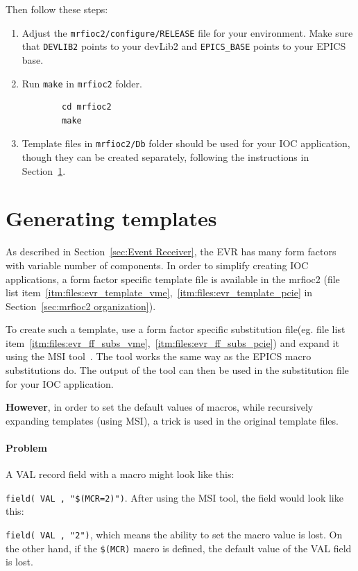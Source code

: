 \documentclass[12pt,a4paper]{article}
\let\stdsection\section
\renewcommand\section{\newpage\stdsection}
\begin{document}
Then follow these steps:
\begin{enumerate}
	\item 
		Adjust the \texttt{mrfioc2/configure/RELEASE} file for your environment. Make sure that \texttt{DEVLIB2} points to your devLib2 and \texttt{EPICS\_BASE} points to your EPICS base.
	\item 
		Run \texttt{make} in \texttt{mrfioc2} folder.
		\begin{verbatim}
		cd mrfioc2
		make
		\end{verbatim}
	\item 
		Template files in \texttt{mrfioc2/Db} folder should be used for your IOC application, though they can be created separately, following the instructions in Section~\ref{sec:Generating templates}.
\end{enumerate}

\section{Generating templates}\label{sec:Generating templates}
As described in Section~\ref{sec:Event Receiver}, the EVR has many form factors with variable number of components. In order to simplify creating IOC applications, a form factor specific template file is available in the mrfioc2 (file list item~\ref{itm:files:evr_template_vme},~\ref{itm:files:evr_template_pcie} in Section~\ref{sec:mrfioc2 organization}).

To create such a template, use a form factor specific substitution file(eg. file list item~\ref{itm:files:evr_ff_subs_vme},~\ref{itm:files:evr_ff_subs_pcie}) and expand it using the
MSI tool~\cite{msi}. The tool works the same way as the EPICS macro substitutions do. The output of
the tool can then be used in the substitution file for your IOC application.

\textbf{However}, in order to set the default values of macros, while
recursively expanding templates (using MSI), a trick is used in the original template files.

\paragraph{Problem}\label{problem}
A VAL record field with a macro might look like this:

\texttt{field( VAL , "\$(MCR=2)")}. 
After using the MSI tool, the field would look like this: 

\texttt{field( VAL , "2")}, 
which means the ability to set the macro value is lost. On the other hand, if the \texttt{\$(MCR)} macro is defined, the default value of the VAL field is lost.
\end{document}
